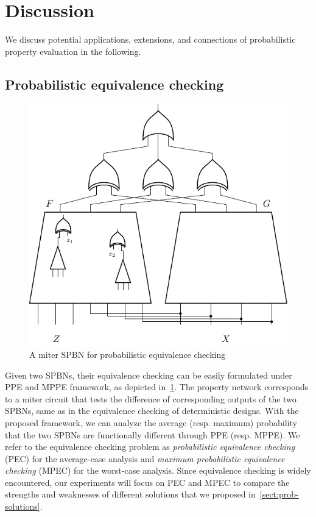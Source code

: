 \section{Discussion}
\label{sect:prob-discussion}

We discuss potential applications, extensions, and connections of probabilistic property evaluation in the following.

\subsection{Probabilistic equivalence checking}
\begin{figure}[t]
    \centering
    \includegraphics{fig/build/pec-miter.pdf}
    \caption{A miter SPBN for probabilistic equivalence checking}
    \label{fig:prob-PEC}
\end{figure}
Given two SPBNs, their equivalence checking can be easily formulated under PPE and MPPE framework,
as depicted in~\cref{fig:prob-PEC}.
The property network corresponds to a miter circuit
that tests the difference of corresponding outputs of the two SPBNs,
same as in the equivalence checking of deterministic designs.
With the proposed framework,
we can analyze the average (resp. maximum) probability
that the two SPBNs are functionally different through PPE (resp. MPPE).
We refer to the equivalence checking problem as
\textit{probabilistic equivalence checking} (PEC) for the average-case analysis and
\textit{maximum probabilistic equivalence checking} (MPEC) for the worst-case analysis.
Since equivalence checking is widely encountered,
our experiments will focus on PEC and MPEC to compare the strengths and weaknesses of different solutions
that we proposed in~\cref{sect:prob-solutions}.

